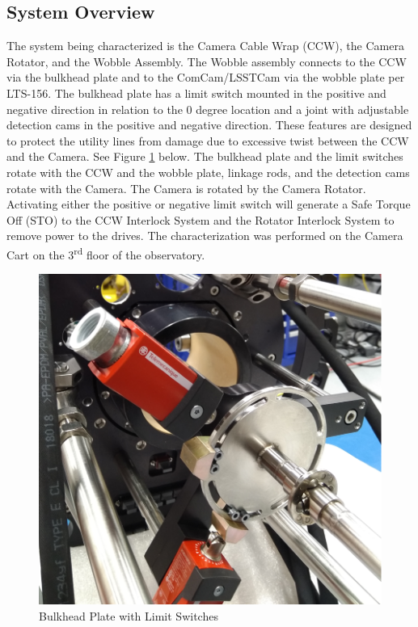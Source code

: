 \documentclass[SE,lsstdraft,authoryear,toc]{lsstdoc}
\begin{document}
\subsection{System Overview}
The system being characterized is the Camera Cable Wrap (CCW), the Camera Rotator, and the Wobble Assembly. The Wobble assembly connects to the CCW via the bulkhead plate and to the ComCam/LSSTCam via the wobble plate per LTS-156. The bulkhead plate has a limit switch mounted in the positive and negative direction in relation to the 0 degree location and a joint with adjustable detection cams in the positive and negative direction. These features are designed to protect the utility lines from damage due to excessive twist between the CCW and the Camera. See Figure \ref{fig:Figure_1} below. The bulkhead plate and the limit switches rotate with the CCW and the wobble plate, linkage rods, and the detection cams rotate with the Camera. The Camera is rotated by the Camera Rotator. Activating either the positive or negative limit switch will generate a Safe Torque Off (STO) to the CCW Interlock System and the Rotator Interlock System to remove power to the drives. The characterization was performed on the Camera Cart on the 3\textsuperscript{rd} floor of the observatory.

\begin{figure}[h!]
  \includegraphics[width=\linewidth]{media/Figure_1.png}
  \caption{Bulkhead Plate with Limit Switches}
  \label{fig:Figure_1}
\end{figure}
\end{document}
